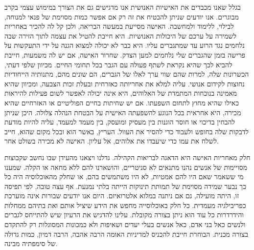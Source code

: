 \documentclass[12pt, extrafontsizes, twopage, a5paper]{memoir}
\begin{document}
בגלל שאנו מכבדים את האישיות האנושית אנו מדגישים גם את הצורך במימוש עצמי בקרב מבוגרים. אנו יודעים שניתן להבטיח את זה רק אם אפשר כמות מסוימת של פנאי למנוחה, לבילוי, ללימוד ולמחשבה. האישה מסייעת במעשה הבריאה, ולכן קל לה להכיר באחריות לשמירה על ערכם של היכולות האנושיות. היא חייבת להטיל את עצמה לתוך הזירה שבה נלחמים נגד הרוע עד שמתגברים עליו. היא כבר לא יכולה למצוא הגנה על ידי התעקשות על פרישה בזמן שהגברים שלי נלחמים למען הצדק. שחרור האישה, אם יש לה משמעות, חייבת להביא לכך שהיא נקראת לשתף פעולה עם הגבר בכל תחומי החיים. מכיוון שלפי דעתי, הכשרונות שלה, למרות שהם שווי ערך לאלו של הגברים, הם שונים מהם, מתנותיה הייחודיות נחוצות לקידום אנושי. עליה למלא את אחריותה כאזרחית ובעלת זכות הצבעה, ומכיוון שהיא מאמינה בנוכחות המתמדת של האלוהים, היא אינה יכולה לאפשר לשום פעילות להיראות כאילו שהיא מחוץ לתחום השפעתו. אם יש שחיתות בחיים הפוליטיים או האזרחיים שהיא מכירה, היא אחראית בכל הנוגע להשפעתה האישית על הבטחת הנהלה צלולה. היכן שניתן להבחין בדיכוי או חוסר הוגנות בין מעסיק ומועסק, בין מעמד למעמד, עליה להיות מודעת לדבקות שלה בחופש ולעבוד כדי להסיר את העוול. העריץ, באשר הוא ובכל מקום שהוא, חייב לשלח את עמו כדי שיעבדו את אלוהים, אל עליון. האישה לא מכירה בשולט אחר.

חלק מאחריות האישה היא הדאגה לבריאות הקהילה. גדלנו ויצאנו מהעידן שבו נחשב שקבוצות מסויימות של אנשים נהנו מתנאים לא סניטריים, והושארנו להם ללא מחאה או הקלה. שמענו מי ששאמר שאם היו להם אמטיות, לא היו משתמשים בהם, או שחלק מהאוכלוסיה היה כל כך נבער שמידה מסוימת של תמותת תינוקות הייתה בלתי נמנעת. אף עצה טובה, לפי תפיסה זו, היתה מועילה, גם אם ניתנה במלוא אלטרואיזם. היום אנו יודעים שבורות אינה מוערכת כפריבילגיה מעמדית. כל חלק באוכלוסייה מחפש את הידע שיציל אותם ואת בתיהם ממחלות והידרדרות כל עוד הוא ניתן בצורה מקובלת. עלינו להדגיש את הרעיון שיש להתייחס לגברים ולנשים כאל בני אדם, כאל אנשים בעלי יעדים ושאיפות ולא כמכונות המסוגלות רק להתקדם בצורה מכנית. הבוחרת חייבת להכניס למדיניות האומה הרבה אהבה, הרבה דמיון, כמות גדולה של סימפתיה מבינה.
\end{document}

